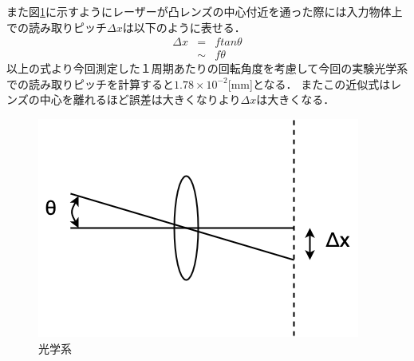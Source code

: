 \documentclass[11pt, a4paper,twocolumn]{jarticle}
\begin{document}
また図\ref{fig:6}に示すようにレーザーが凸レンズの中心付近を通った際には入力物体上での読み取りピッチ$\Delta x$は以下のように表せる．
\begin{eqnarray}
    \Delta{x} &=& ftan{\theta} \\
    &\sim& f\theta
\end{eqnarray}
以上の式より今回測定した１周期あたりの回転角度を考慮して今回の実験光学系での読み取りピッチを計算すると$1.78\times{10^{-2}}$[mm]となる．
またこの近似式はレンズの中心を離れるほど誤差は大きくなりより$\Delta{x}$は大きくなる．

\begin{figure}[ht]
 \begin{center}
  \includegraphics[width=0.8\linewidth]{fig6.png}
 \end{center}
 \caption{光学系}
 \label{fig:6}
\end{figure}

\newpage
\end{document}
